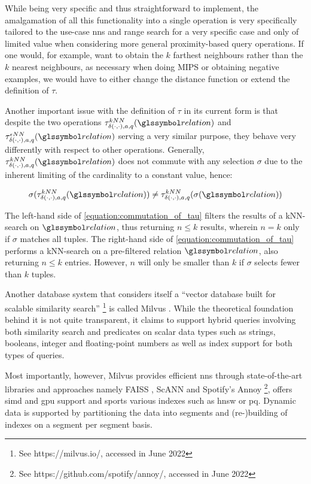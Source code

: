 While being very specific and thus straightforward to implement, the amalgamation of all this functionality into a single operation is very specifically tailored to the use-case \acrshort{nns} and range search for a very specific case and only of limited value when considering more general proximity-based query operations. If one would, for example, want to obtain the $k$ farthest neighbours rather than the $k$ nearest neighbours, as necessary when doing MIPS or obtaining negative examples, we would have to either change the distance function or extend the definition of $\tau$. 

Another important issue with the definition of $\tau$ in its current form is that despite the two operations $\tau^{kNN}_{\delta(\cdot,\cdot),a,q}(\relation)$ and $\tau^{\epsilon NN}_{\delta(\cdot,\cdot),a,q}(\relation)$ serving a very similar purpose, they behave very differently with respect to other operations. Generally, $\tau^{kNN}_{\delta(\cdot,\cdot),a,q}(\relation)$ does not commute with any selection $\sigma$ due to the inherent limiting of the cardinality to a constant value, hence:

\begin{equation}
    \label{equation:commutation_of_tau}
    \sigma(\tau^{kNN}_{\delta(\cdot,\cdot),a,q}(\relation)) \neq \tau^{kNN}_{\delta(\cdot,\cdot),a,q}(\sigma(\relation))
\end{equation}

The left-hand side of \cref{equation:commutation_of_tau} filters the results of a kNN-search on $\relation$, thus returning $n \leq k$ results, wherein $n = k$ only if $\sigma$ matches all tuples. The right-hand side of \cref{equation:commutation_of_tau} performs a kNN-search on a pre-filtered relation $\relation$, also returning $n \leq k$ entries. However, $n$ will only be smaller than $k$ if $\sigma$ selects fewer than $k$ tuples.

Another database system that considers itself a ``vector database built for scalable similarity search'' \footnote{See https://milvus.io/, accessed in June 2022} is called Milvus \cite{Wang:2021Milvus}. While the theoretical foundation behind it is not quite transparent, it claims to support hybrid queries involving both similarity search and predicates on scalar data types such as strings, booleans, integer and floating-point numbers as well as index support for both types of queries.

Most importantly, however, Milvus provides efficient \acrshort{nns} through state-of-the-art libraries and approaches namely FAISS \cite{Johnson:2019Billion}, ScANN \cite{Guo:2020Accelerating} and Spotify's Annoy \footnote{See https://github.com/spotify/annoy/, accessed in June 2022}, offers \acrshort{simd} and \acrshort{gpu} support and sports various indexes such as \acrshort{hnsw} or \acrshort{pq}. Dynamic data is supported by partitioning the data into segments and (re-)building of indexes on a segment per segment basis.
